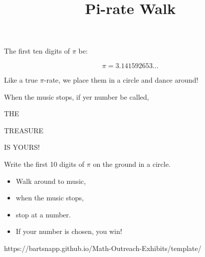 \documentclass{../exhibit}
\title{Pi-rate Walk}
\begin{document}
\begin{context}
  The first ten digits of $\pi$ be:

  \[
  \pi=3.141592653\dots
  \]

  Like a true $\pi$-rate, we place them in a circle and dance around!


  When the music stops, if yer number be called,



  THE

  \qquad TREASURE

  
  \qquad \qquad \qquad  IS YOURS!
\end{context}



\begin{directions}

  Write the first 10 digits of $\pi$ on the ground in a circle.
  \begin{itemize}
    \item Walk around to music,
    \item when the music stops,
    \item stop at a number.
    \item If your number is chosen, you win!
  \end{itemize}
  \end{directions}



\begin{example}\HUGE
  \begin{center}
  \end{center}
\end{example}



\begin{mathConnections}
  https://bartsnapp.github.io/Math-Outreach-Exhibits/template/
\end{mathConnections}
\end{document}
